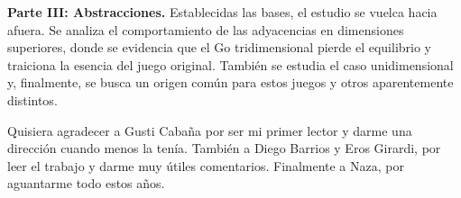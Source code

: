 \textbf{Parte III: Abstracciones.} Establecidas las bases, el estudio se vuelca hacia afuera. Se analiza el comportamiento de las adyacencias en dimensiones superiores, donde se evidencia que el Go tridimensional pierde el equilibrio y traiciona la esencia del juego original. También se estudia el caso unidimensional y, finalmente, se busca un origen común para estos juegos y otros aparentemente distintos.

\vfill

Quisiera agradecer a Gusti Cabaña por ser mi primer lector y darme una dirección cuando menos la tenía. También a Diego Barrios y Eros Girardi, por leer el trabajo y darme muy útiles comentarios. Finalmente a Naza, por aguantarme todo estos años.
\clearpage

\tableofcontents
\thispagestyle{empty}
\clearpage